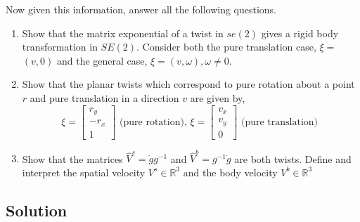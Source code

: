 Now given this information, answer all the following questions.
\begin{enumerate}[label= (\alph*)]
    \item Show that the matrix exponential of a twist in \( s e(2) \) gives a rigid body transformation in \( S E(2) \).
          Consider both the pure translation case, \( \xi= \) \( (v, 0) \) and the general case, \( \xi=(v, \omega), \omega \neq 0 \).
    \item Show that the planar twists which correspond to pure rotation about a point \( r \) and pure translation in a direction \( v \) are given by,
          \[
              \xi=\left[\begin{array}{c}
                      r_{y}  \\
                      -r_{x} \\
                      1
                  \end{array}\right] \text { (pure rotation), } \xi=\left[\begin{array}{c}
                      v_{x} \\
                      v_{y} \\
                      0
                  \end{array}\right] \text { (pure translation) }
          \]
    \item Show that the matrices \( \hat{V}^{s}=\dot{g} g^{-1} \) and \( \hat{V}^{b}=g^{-1} \dot{g} \) are both twists.
          Define and interpret the spatial velocity \( V^{s} \in \mathbb{R}^{3} \) and the body velocity \( V^{b} \in \mathbb{R}^{3} \)
\end{enumerate}

\clearpage
\subsection*{Solution}
